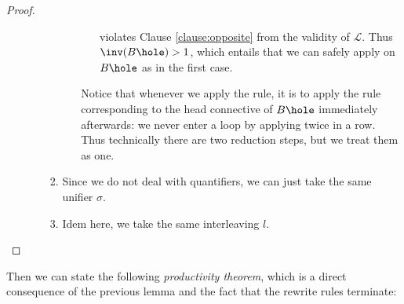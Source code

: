 \begin{proof}
\begin{enumerate}
\begin{itemize}
\begin{enumerate}
\begin{itemize}
\begin{itemize}
            violates Clause \ref{clause:opposite} from the validity of
            $\mathcal{L}$. Thus $\inv(B\hole) > 1$, which entails that we can
            safely apply {} on $B\hole$ as in the first case.
          \end{itemize}
          Notice that whenever we apply the {} rule, it is to apply
          the rule corresponding to the head connective of $B\hole$ immediately
          afterwards: we never enter a loop by applying {} twice in
          a row. Thus technically there are two reduction steps, but we treat
          them as one.
        \end{itemize}
        
        

        \item Since we do not deal with quantifiers, we can just take the same
        unifier $\sigma$.

        \item Idem here, we take the same interleaving $l$.
      \end{enumerate}
    \end{itemize} 
  \end{enumerate}
\end{proof}


Then we can state the following \emph{productivity theorem}, which is a direct
consequence of the previous lemma and the fact that the rewrite rules
terminate:

